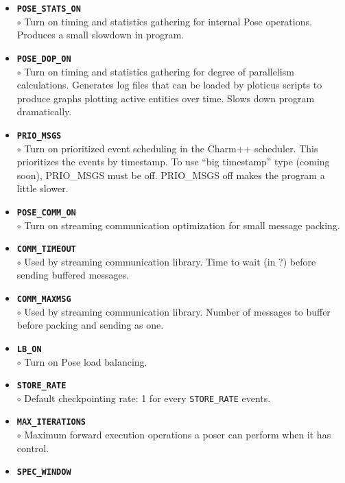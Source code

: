 \documentclass[10pt]{article}
\newcommand{\pose}{{\sc Pose}}
\begin{document}
\begin{itemize}
\item {\tt {\bf POSE\_STATS\_ON}}\\
	$\circ$ Turn on timing and statistics gathering for internal \pose{}
	operations.  Produces a small slowdown in program.\\
\item {\tt {\bf POSE\_DOP\_ON}}\\
	$\circ$ Turn on timing and statistics gathering for degree of parallelism calculations.  Generates log files that can be loaded by ploticus scripts to produce graphs plotting active entities over time.  Slows down program dramatically.\\
\item {\tt {\bf PRIO\_MSGS}}\\ $\circ$ Turn on prioritized event
	scheduling in the Charm++ scheduler.  This prioritizes the
	events by timestamp.  To use ``big timestamp'' type (coming
	soon), PRIO\_MSGS must be off.  PRIO\_MSGS off makes the program
	a little slower.\\
\item {\tt {\bf POSE\_COMM\_ON}}\\
	$\circ$ Turn on streaming communication optimization for small message packing.\\
\item {\tt {\bf COMM\_TIMEOUT}}\\
	$\circ$ Used by streaming communication library. Time to wait (in ?) before sending buffered messages.\\
\item {\tt {\bf COMM\_MAXMSG}}\\
	$\circ$ Used by streaming communication library.  Number of messages to buffer before packing and sending as one.\\
\item {\tt {\bf LB\_ON}}\\
	$\circ$ Turn on \pose{} load balancing.\\
\item {\tt {\bf STORE\_RATE}}\\
	$\circ$ Default checkpointing rate: 1 for every {\tt STORE\_RATE} events.\\
\item {\tt {\bf MAX\_ITERATIONS}}\\
	$\circ$ Maximum forward execution operations a poser can perform when it has control.\\
\item {\tt {\bf SPEC\_WINDOW}}\\

\end{itemize}
\end{document}
